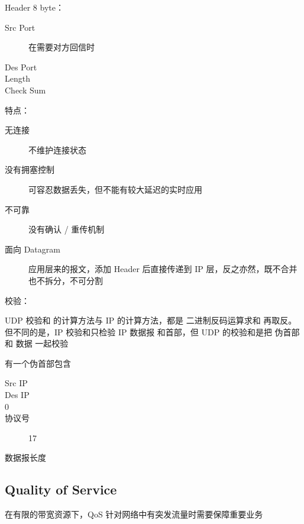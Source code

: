 \documentclass[11pt,journal,compsoc]{IEEEtran}
\begin{document}
Header 8 byte：

\begin{description}
    \item[Src Port] 在需要对方回信时

    \item[Des Port] 

    \item[Length] 

    \item[Check Sum] 
\end{description}

特点：

\begin{description}
    \item[无连接] 不维护连接状态

    \item[没有拥塞控制] 可容忍数据丢失，但不能有较大延迟的实时应用

    \item[不可靠] 没有确认 / 重传机制

    \item[面向 Datagram] 应用层来的报文，添加 Header 后直接传递到 IP 层，反之亦然，既不合并也不拆分，不可分割
\end{description}

校验：

UDP 校验和 的计算方法与 IP 的计算方法，都是 二进制反码运算求和 再取反。但不同的是，IP 校验和只检验 IP 数据报 和首部，但 UDP 的校验和是把 伪首部 和 数据 一起校验

有一个伪首部包含

\begin{description}
    \item[Src IP]

    \item[Des IP] 

    \item[0] 

    \item[协议号] 17

    \item[数据报长度] 
\end{description}


\subsection{Quality of Service}

在有限的带宽资源下，QoS 针对网络中有突发流量时需要保障重要业务
\end{document}
